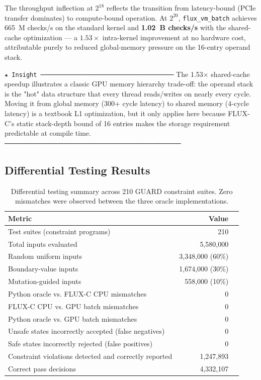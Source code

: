 \documentclass[conference]{IEEEtran}
\begin{document}
The throughput inflection at $2^{18}$ reflects the transition from
latency-bound (PCIe transfer dominates) to compute-bound operation.
At $2^{20}$, \texttt{flux\_vm\_batch} achieves 665~M checks/s on the
standard kernel and \textbf{1.02~B checks/s} with the shared-cache
optimization — a $1.53\times$ intra-kernel improvement at no hardware
cost, attributable purely to reduced global-memory pressure on the 16-entry
operand stack.

\texttt{★ Insight ─────────────────────────────────────}
The 1.53× shared-cache speedup illustrates a classic GPU memory hierarchy
trade-off: the operand stack is the "hot" data structure that every thread
reads/writes on nearly every cycle. Moving it from global memory (300+ cycle
latency) to shared memory (4-cycle latency) is a textbook L1 optimization,
but it only applies here because FLUX-C's static stack-depth bound of 16
entries makes the storage requirement predictable at compile time.
\texttt{─────────────────────────────────────────────────}

\subsection{Differential Testing Results}
\label{sec:eval-difftest}

\begin{table}[t]
\centering
\caption{Differential testing summary across 210 GUARD constraint suites.
Zero mismatches were observed between the three oracle implementations.}
\label{tab:difftest}
\renewcommand{\arraystretch}{1.15}
\begin{tabular}{lrr}
\toprule
\textbf{Metric} & \textbf{Value} \\
\midrule
Test suites (constraint programs)       & 210 \\
Total inputs evaluated                  & 5,580,000 \\
Random uniform inputs                   & 3,348,000 (60\%) \\
Boundary-value inputs                   & 1,674,000 (30\%) \\
Mutation-guided inputs                  & 558,000 (10\%) \\
\midrule
Python oracle vs. FLUX-C CPU mismatches & 0 \\
FLUX-C CPU vs. GPU batch mismatches     & 0 \\
Python oracle vs. GPU batch mismatches  & 0 \\
\midrule
Unsafe states incorrectly accepted (false negatives) & 0 \\
Safe states incorrectly rejected (false positives)   & 0 \\
\midrule
Constraint violations detected and correctly reported & 1,247,893 \\
Correct pass decisions                  & 4,332,107 \\
\bottomrule
\end{tabular}
\end{table}
\end{document}
